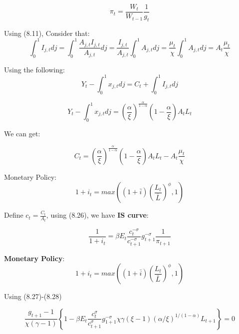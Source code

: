 \documentclass[cn,10pt,math=newtx,citestyle=gb7714-2015,bibstyle=gb7714-2015]{elegantbook}
\begin{document}
{{	\begin{equation}
		\pi_t =  \frac{W_t}{W_{t-1}}\frac{1}{g_t}
	\end{equation}
	
	Using (8.11), Consider that:
	$$\int_0^1 I_{j,t}dj = \int_0^1 \frac{A_{j,t}I_{j,t}}{A_{j,t}}dj =\frac{I_{j,t}}{A_{j,t}} \int_0^1 A_{j,t}dj = \frac{\mu_t}{\chi}\int_0^1 A_{j,t}dj =A_t\frac{\mu_t}{\chi}$$
	
	Using the following:
$$
		Y_t - \int_0^1 x_{j,t}dj = C_t +\int_0^1I_{j,t}dj
		$$
	
$$
		Y_t - \int_0^1 x_{j,t}dj = \left(\frac{\alpha}{\xi}\right)^{\frac{\alpha}{1-\alpha}}\left(1-\frac{\alpha}{\xi}\right)A_tL_t
	$$
	
	We can get:
	
	\begin{equation}
		C_t =  \left(\frac{\alpha}{\xi}\right)^{\frac{\alpha}{1-\alpha}}\left(1-\frac{\alpha}{\xi}\right)A_tL_t-A_t\frac{\mu_t}{\chi}
	\end{equation}
	
	
	Monetary Policy:
	\begin{equation}
		1+i_t = max \left((1+\bar{i})\left(\frac{L_t}{\bar{L}}\right)^\phi,1\right)
		\end{equation}
	
	Define $c_t = \frac{C_t}{A_t}$, using (8.26), we have \textbf{IS curve}:
	
	\begin{equation}
			\frac{1}{1+i_t} = \beta E_t \frac{c_{t}^{-\sigma}}{c_{t+1}^{-\sigma}}g_{t+1}^{-\sigma}\frac{1}{\pi_{t+1}}
	\end{equation}

	\textbf{Monetary Policy}:
\begin{equation}
	1+i_t = max \left((1+\bar{i})\left(\frac{L_t}{\bar{L}}\right)^\phi,1\right)
\end{equation}

Using (8.27)-(8.28)

\begin{equation}
	\frac{g_{t+1}-1}{\chi(\gamma-1)}\left\{1-\beta E_t \frac{c_t^\sigma}{c_{t+1}^\sigma}g_{1+1}^{-\sigma}\chi \gamma (\xi-1)(\alpha / \xi)^{1 /(1-\alpha)} L_{t+1}\right\}=0
	\end{equation}

}}
\end{document}
